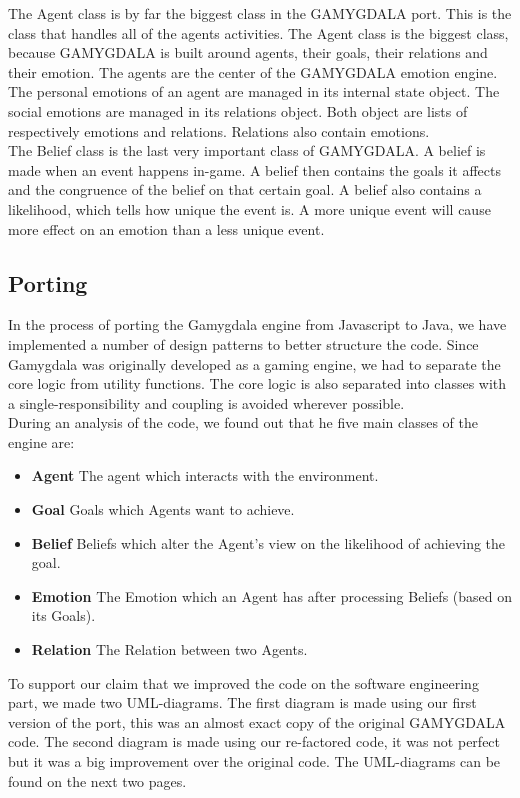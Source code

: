 The Agent class is by far the biggest class in the GAMYGDALA port. This is the class that handles all of the agents activities. The Agent class is the biggest class, because GAMYGDALA is built around agents, their goals, their relations and their emotion. The agents are the center of the GAMYGDALA emotion engine. The personal emotions of an agent are managed in its internal state object. The social emotions are managed in its relations object. Both object are lists of respectively emotions and relations. Relations also contain emotions. \\

The Belief class is the last very important class of GAMYGDALA. A belief is made when an event happens in-game. A belief then contains the goals it affects and the congruence of the belief on that certain goal. A belief also contains a likelihood, which tells how unique the event is. A more unique event will cause more effect on an emotion than a less unique event.

\subsection{Porting}
In the process of porting the Gamygdala engine from Javascript to Java, we have implemented a number of design patterns to better structure the code. Since Gamygdala was originally developed as a gaming engine, we had to separate the core logic from utility functions. The core logic is also separated into classes with a single-responsibility and coupling is avoided wherever possible. \\

During an analysis of the code, we found out that he five main classes of the engine are:
\begin{itemize}
	\item \textbf{Agent} The agent which interacts with the environment.
	\item \textbf{Goal} Goals which Agents want to achieve.
	\item \textbf{Belief} Beliefs which alter the Agent's view on the likelihood of achieving the goal.
	\item \textbf{Emotion} The Emotion which an Agent has after processing Beliefs (based on its Goals).
	\item \textbf{Relation} The Relation between two Agents.
\end{itemize}

To support our claim that we improved the code on the software engineering part, we made two UML-diagrams. The first diagram is made using our first version of the port, this was an almost exact copy of the original GAMYGDALA code. The second diagram is made using our re-factored code, it was not perfect but it was a big improvement over the original code. The UML-diagrams can be found on the next two pages.\\

